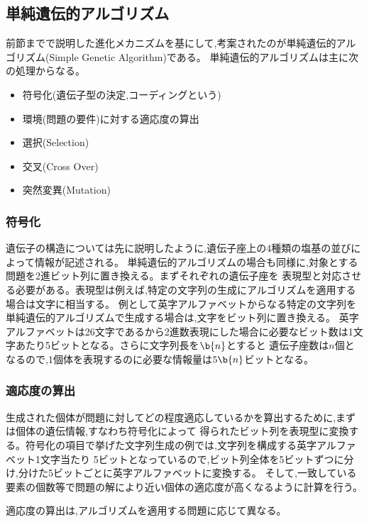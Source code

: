 \subsection{単純遺伝的アルゴリズム}
前節までで説明した進化メカニズムを基にして,考案されたのが単純遺伝的アルゴリズム(Simple Genetic Algorithm)である。
単純遺伝的アルゴリズムは主に次の処理からなる。

\begin{itemize}
  \item 符号化(遺伝子型の決定,コーディングという)
  \item 環境(問題の要件)に対する適応度の算出
  \item 選択(Selection)
  \item 交叉(Cross Over)
  \item 突然変異(Mutation)
\end{itemize}

\subsubsection{符号化}
遺伝子の構造については先に説明したように,遺伝子座上の4種類の塩基の並びによって情報が記述される。
単純遺伝的アルゴリズムの場合も同様に,対象とする問題を2進ビット列に置き換える。まずそれぞれの遺伝子座を
表現型と対応させる必要がある。表現型は例えば,特定の文字列の生成にアルゴリズムを適用する場合は文字に相当する。
例として英字アルファベットからなる特定の文字列を単純遺伝的アルゴリズムで生成する場合は,文字をビット列に置き換える。
英字アルファベットは26文字であるから2進数表現にした場合に必要なビット数は1文字あたり5ビットとなる。さらに文字列長を$\b{n}$とすると
遺伝子座数は$n$個となるので,1個体を表現するのに必要な情報量は$5\b{n}$ビットとなる。

\subsubsection{適応度の算出}
生成された個体が問題に対してどの程度適応しているかを算出するために,まずは個体の遺伝情報,すなわち符号化によって
得られたビット列を表現型に変換する。符号化の項目で挙げた文字列生成の例では,文字列を構成する英字アルファベット1文字当たり
5ビットとなっているので,ビット列全体を5ビットずつに分け,分けた5ビットごとに英字アルファベットに変換する。
そして,一致している要素の個数等で問題の解により近い個体の適応度が高くなるように計算を行う。

適応度の算出は,アルゴリズムを適用する問題に応じて異なる。

